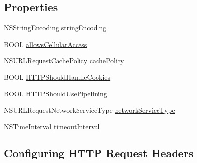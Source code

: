 \subsection*{Properties}
\begin{DoxyCompactItemize}
\item 
N\+S\+String\+Encoding \mbox{\hyperlink{interface_a_f_h_t_t_p_request_serializer_adbc30f08c984b2ca0922d871bf625d8f}{string\+Encoding}}
\item 
B\+O\+OL \mbox{\hyperlink{interface_a_f_h_t_t_p_request_serializer_ad1e2a4f25d1f250c8a702c3b0d9e6a8b}{allows\+Cellular\+Access}}
\item 
N\+S\+U\+R\+L\+Request\+Cache\+Policy \mbox{\hyperlink{interface_a_f_h_t_t_p_request_serializer_ace509f9a4a7798cee965d6d0939196a7}{cache\+Policy}}
\item 
B\+O\+OL \mbox{\hyperlink{interface_a_f_h_t_t_p_request_serializer_a87ed9e46c52d429016869a7d2bc46b97}{H\+T\+T\+P\+Should\+Handle\+Cookies}}
\item 
B\+O\+OL \mbox{\hyperlink{interface_a_f_h_t_t_p_request_serializer_aff714e6d87d3063daa6ba8c5e504ec4e}{H\+T\+T\+P\+Should\+Use\+Pipelining}}
\item 
N\+S\+U\+R\+L\+Request\+Network\+Service\+Type \mbox{\hyperlink{interface_a_f_h_t_t_p_request_serializer_a5606b2650ff3860a4ae94ea06f2b1d9c}{network\+Service\+Type}}
\item 
N\+S\+Time\+Interval \mbox{\hyperlink{interface_a_f_h_t_t_p_request_serializer_aaf4bf60cd1896ade2788764892496812}{timeout\+Interval}}
\end{DoxyCompactItemize}
\subsection*{Configuring H\+T\+TP Request Headers}
\label{_amgrpffb4931d6fbb854a997b29c058459123}%


 

